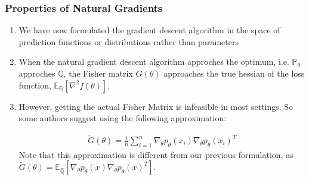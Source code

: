\documentclass[hyperref={pdfpagelabels=false}]{beamer}
\begin{document}
\begin{frame}
\frametitle{Properties of Natural Gradients}
\begin{enumerate}
\item We have now formulated the gradient descent algorithm in the space of prediction functions or distributions rather than parameters

\item When the natural gradient descent algorithm approches the optimum, i.e. $\mathbb{P}_{\theta}$ approches $\mathbb{Q}$, the Fisher matrix $G(\theta)$ approaches the true hessian of the loss function, $\mathbb{E}_{\mathbb{Q}}[\nabla^{2} f(\theta)]$.


\item However, getting the actual Fisher Matrix is infeasible in most settings. So some authors suggest using the following approximation:

\begin{align*}
\tilde{G}(\theta) = \frac{1}{n}\sum_{i=1}^{n} \nabla_{\theta}p_{\theta}(x_i) \nabla_{\theta}p_{\theta}(x_i)^T
\end{align*}
Note that this approximation is different from our previous formulation, as $\tilde{G}(\theta) = \mathbb{E}_{\hat{\mathbb{Q}}} [\nabla_{\theta}p_{\theta}(x) \nabla_{\theta}p_{\theta}(x)^T]$.
\end{enumerate}
\end{frame}

\end{document}

